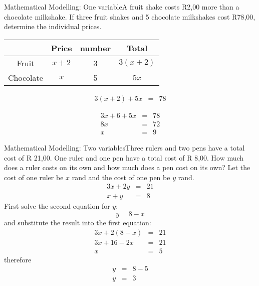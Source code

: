 \documentclass[10pt,a4paper,titlepage,twoside,openright]{report}
\begin{document}
\begin{wex}{Mathematical Modelling: One variable}{A fruit shake costs R2,00 more than a chocolate milkshake.  If three fruit shakes and 5 chocolate milkshakes cost R78,00, determine the individual prices.}
{
\begin{center}
\begin{tabular}{|c||c|c|c|}\hline
&Price &number &Total\\\hline
Fruit & $x+2$&3&$3(x+2)$\\\hline
Chocolate & $x$ &5 &$5x$\\\hline
\end{tabular}
\end{center}

\begin{eqnarray*}
3(x+2)+5x&=&78
\end{eqnarray*}

\begin{eqnarray*}
3x+6+5x&=&78 \\
8x &=& 72\\
x&=&9
\end{eqnarray*}

\quad\quad\quad{}
}
\end{wex}

\begin{wex}{Mathematical Modelling:  Two variables}{Three rulers and two pens have a total cost of R 21,00.  One ruler and one pen have a total cost of R 8,00.  How much does a ruler costs on its own and how much does a pen cost on its own?}
{
Let the cost of one ruler be $x$ rand and the cost of one pen be $y$ rand.
\begin{eqnarray}
3x+2y &=&21\\
x+y &=& 8
\end{eqnarray}
First solve the second equation for $y$:
\begin{equation*}
y=8-x
\end{equation*}
and substitute the result into the first equation:\\
\begin{eqnarray*}
3x+2(8-x)&=&21\\
3x+16-2x&=&21\\
x&=&5
\end{eqnarray*}
therefore
\begin{eqnarray*}
y&=&8-5\\
y&=&3
\end{eqnarray*}
\quad\quad\quad{}
}
\end{wex}
 
\end{document}

